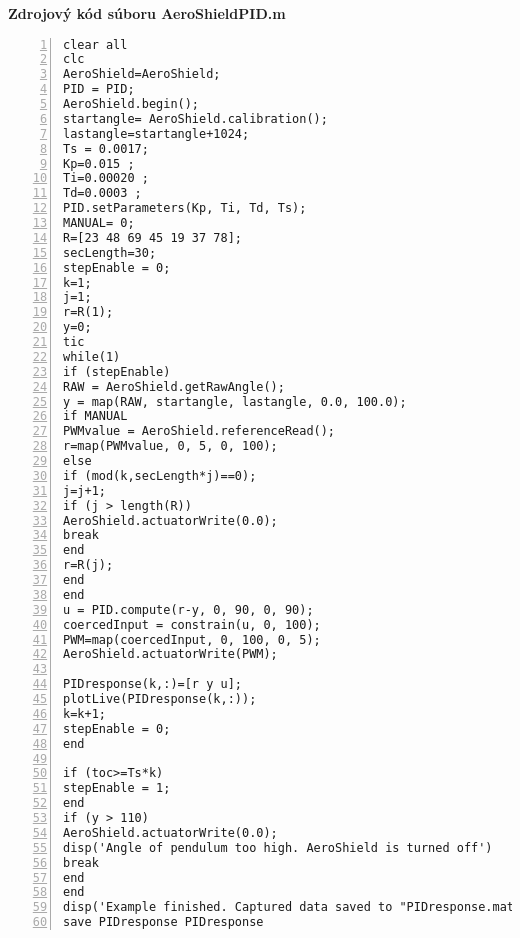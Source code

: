\LARGE\bf{Zdrojový kód súboru AeroShieldPID.m}
\label{AeroShieldPID.m}
\vspace{1cm}
\begin{lstlisting}[numbers=left,basicstyle=\scriptsize,caption={Zdrojový kód súboru AeroShieldPID.m.},captionpos=b]	
clear all
clc 
AeroShield=AeroShield; 
PID = PID;
AeroShield.begin();
startangle= AeroShield.calibration(); 
lastangle=startangle+1024; 
Ts = 0.0017;   
Kp=0.015 ;
Ti=0.00020 ;
Td=0.0003 ;  
PID.setParameters(Kp, Ti, Td, Ts);
MANUAL= 0;
R=[23 48 69 45 19 37 78];
secLength=30; 
stepEnable = 0;  
k=1; 
j=1;
r=R(1);
y=0;      
tic 
while(1) 
if (stepEnable) 
RAW = AeroShield.getRawAngle();
y = map(RAW, startangle, lastangle, 0.0, 100.0);
if MANUAL  
PWMvalue = AeroShield.referenceRead(); 
r=map(PWMvalue, 0, 5, 0, 100);
else 
if (mod(k,secLength*j)==0); 
j=j+1; 
if (j > length(R)) 
AeroShield.actuatorWrite(0.0); 
break  
end
r=R(j); 
end
end
u = PID.compute(r-y, 0, 90, 0, 90); 
coercedInput = constrain(u, 0, 100); 
PWM=map(coercedInput, 0, 100, 0, 5); 
AeroShield.actuatorWrite(PWM); 

PIDresponse(k,:)=[r y u];
plotLive(PIDresponse(k,:)); 
k=k+1;  
stepEnable = 0; 
end      

if (toc>=Ts*k)      
stepEnable = 1;            
end
if (y > 110)        
AeroShield.actuatorWrite(0.0); 
disp('Angle of pendulum too high. AeroShield is turned off')
break                     
end
end   
disp('Example finished. Captured data saved to "PIDresponse.mat" file.')
save PIDresponse PIDresponse     
\end{lstlisting}